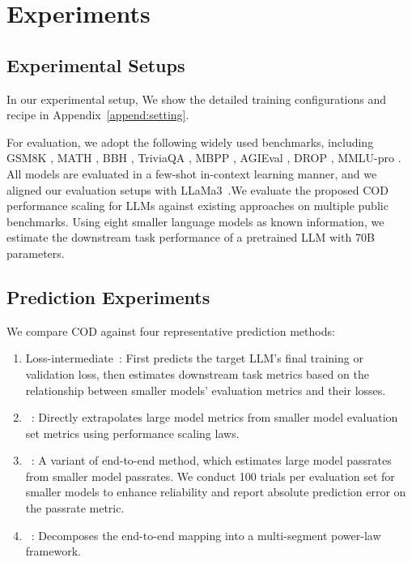 
\vspace{-5pt}
\section{Experiments}
\label{sec:expr}
\vspace{-5pt}
\subsection{Experimental Setups}
\label{sec:exp_setups}

In our experimental setup,  We show the detailed training configurations and recipe in Appendix~\ref{append:setting}.

For evaluation, we adopt the following widely used benchmarks, including GSM8K \citep{cobbe2021training}, MATH \citep{hendrycks2021measuring}, BBH \citep{suzgun2023challenging}, TriviaQA \citep{joshi2017triviaqa},
MBPP \citep{austin2021program}, AGIEval \citep{zhong2023agieval},
DROP \citep{dua2019drop}, MMLU-pro \citep{wang2024mmlu}. 
All models are evaluated in a few-shot in-context learning manner, and we aligned our evaluation setups with LLaMa3~\citep{dubey2024llama}.We evaluate the proposed COD performance scaling for LLMs against existing approaches on multiple public benchmarks. Using eight smaller language models as known information, we estimate the downstream task performance of a pretrained LLM with 70B parameters. 

\subsection{Prediction Experiments}
\label{subsec:Prediction_Experiments}
We compare COD against four representative prediction methods:
\begin{enumerate}[leftmargin=2em]
\item Loss-intermediate~\citep{chen2024scaling}: First predicts the target LLM's final training or validation loss, then estimates downstream task metrics based on the relationship between smaller models' evaluation metrics and their losses.
\item {}~\citep{xiao2024densing}: Directly extrapolates large model metrics from smaller model evaluation set metrics using  performance scaling laws.
\item {}~\citep{achiam2023gpt,hu2023predicting}: A variant of end-to-end method, which estimates large model passrates from smaller model passrates. We conduct 100 trials per evaluation set for smaller models to enhance reliability and report absolute prediction error on the passrate metric.
\item {}~\citep{caballero2022broken}: Decomposes the end-to-end mapping into a multi-segment power-law framework.
\end{enumerate}

